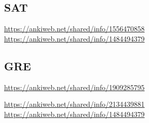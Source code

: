 \documentclass{article}
\begin{document}
\subsection{SAT}

	
	\newline
	\url{https://ankiweb.net/shared/info/1556470858}
	\newline
	\url{https://ankiweb.net/shared/info/1484494379}
	\newline
	\subsection{GRE}

	
	\newline
	\url{https://ankiweb.net/shared/info/1909285795}
	
	\newline
	\url{https://ankiweb.net/shared/info/2134439881}
	\newline
	\url{https://ankiweb.net/shared/info/1484494379}
	\newline
	
	
	
	\paragraph{}
	
\end{document}
